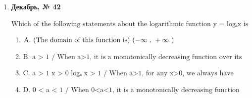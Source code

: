 \begin{enumerate}
\begin{enumerate}
\item $\displaystyle \text{A. -5}$
\item $\displaystyle \text{B. 10}$
\item $\displaystyle \text{C. 0}$
\item $\displaystyle \text{D. 5}$
\end{enumerate}
\item \textbf{Декабрь, № 42} \par \smallskip
$\displaystyle \text{Which of the following statements about the logarithmic function y = logₐx is correct?}$
\begin{enumerate}
\item $\displaystyle \text{A.  (The domain of this function is) }(-\infty\text{ , }+\infty\text{ )}$
\item $\displaystyle \text{B.  a > 1  / When a>1, it is a monotonically decreasing function over its domain}$
\item $\displaystyle \text{C.  a > 1  x > 0  logₐ x > 1 / When a>1, for any x>0, we always have logₐx>1}$
\item $\displaystyle \text{D.  0 < a < 1  / When 0<a<1, it is a monotonically decreasing function over its domain}$
\end{enumerate}
\end{enumerate}

